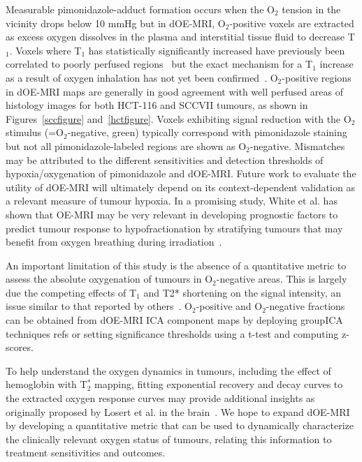 Measurable pimonidazole-adduct formation occurs when the O$_2$ tension in the vicinity drops below 10 mmHg but in dOE-MRI, O$_2$-positive voxels are extracted as excess oxygen dissolves in the plasma and interstitial tissue fluid to decrease T$_1$.
Voxels where T$_1$ has statistically significantly increased have previously been correlated to poorly perfused regions~\cite{Linnik:2013hf} but the exact mechanism for a T$_1$ increase as a result of oxygen inhalation has not yet been confirmed~\cite{Zhao:2015ez, OConnor:2016ee}.
O$_2$-positive regions in dOE-MRI maps are generally in good agreement with well perfused areas of histology images for both HCT-116 and SCCVII tumours, as shown in Figures~\ref{sccfigure} and~\ref{hctfigure}.
Voxels exhibiting signal reduction with the O$_2$ stimulus (=O$_2$-negative, green) typically correspond with pimonidazole staining but not all pimonidazole-labeled regions are shown as O$_2$-negative.
Mismatches may be attributed to the different sensitivities and detection thresholds of hypoxia/oxygenation of pimonidazole and dOE-MRI.
Future work to evaluate the utility of dOE-MRI will ultimately depend on its context-dependent validation as a relevant measure of tumour hypoxia.
In a promising study, White et al.
has shown that OE-MRI may be very relevant in developing prognostic factors to predict tumour response to hypofractionation by stratifying tumours that may benefit from oxygen breathing during irradiation~\cite{White:2016fz}.

An important limitation of this study is the absence of a quantitative metric to assess the absolute oxygenation of tumours in O$_2$-negative areas.
This is largely due the competing effects of T$_1$ and T2* shortening on the signal intensity, an issue similar to that reported by others~\cite{Remmele:2012df,Burrell:2013je,Linnik:2013hf}.
O$_2$-positive and O$_2$-negative fractions can be obtained from dOE-MRI ICA component maps by deploying groupICA techniques {refs} or setting significance thresholds using a t-test and computing z-scores.

To help understand the oxygen dynamics in tumours, including the effect of hemoglobin with T$_2^*$ mapping, fitting exponential recovery and decay curves to the extracted oxygen response curves may provide additional insights as originally proposed by Losert et al.
in the brain~\cite{Losert:2002gt}.
We hope to expand dOE-MRI by developing a quantitative metric that can be used to dynamically characterize the clinically relevant oxygen status of tumours, relating this information to treatment sensitivities and outcomes.


